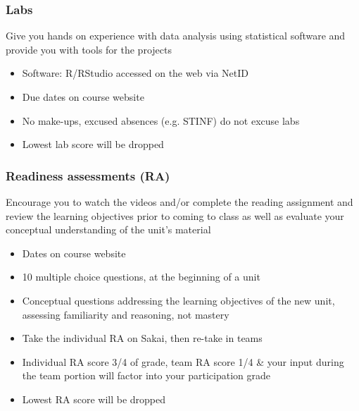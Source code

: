 \documentclass[slidestop,compress,mathserif,12pt,t,professionalfonts,xcolor=table]{beamer}
\begin{document}

\begin{frame}[fragile]
\frametitle{Labs}

 Give you hands on experience with data analysis using statistical software and provide you with tools for the projects

\begin{itemize}

\item Software: R/RStudio accessed on the web via NetID

\item Due dates on course website

\item No make-ups, excused absences (e.g. STINF) do not excuse labs

\item Lowest lab score will be dropped

\end{itemize}

\end{frame}


\begin{frame}
\frametitle{Readiness assessments (RA)}

 Encourage you to watch the videos and/or complete the reading assignment and review the learning objectives prior to coming to class as well as evaluate your conceptual understanding of the unit's material

\begin{itemize}

\item Dates on course website

\item 10 multiple choice questions, at the beginning of a unit

\item Conceptual questions addressing the learning objectives of the new unit, assessing familiarity and reasoning, not mastery

\item Take the individual RA on Sakai, then re-take in teams

\item Individual RA score 3/4 of grade, team RA score 1/4 \& your input during the team portion will factor into your participation grade

\item Lowest RA score will be dropped

\end{itemize}

\end{frame}
\end{document}
